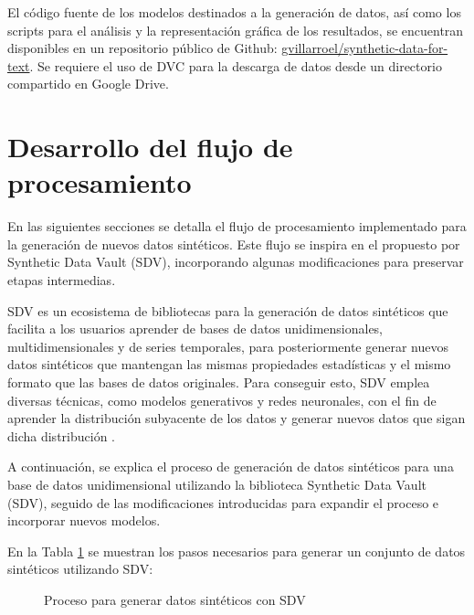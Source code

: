 El código fuente de los modelos destinados a la generación de datos, así como los scripts para el análisis y la representación gráfica de los resultados, se encuentran disponibles en un repositorio público de Github:
\href{https://github.com/gvillarroel/synthetic-data-for-text}{gvillarroel/synthetic-data-for-text}. Se requiere el uso de DVC para la descarga de datos desde un directorio compartido en Google Drive.

\newpage

\section{Desarrollo del flujo de procesamiento}
\label{subsec:procesamiento}
En las siguientes secciones se detalla el flujo de procesamiento implementado para la generación de nuevos datos sintéticos. Este flujo se inspira en el propuesto por Synthetic Data Vault (SDV), incorporando algunas modificaciones para preservar etapas intermedias.

SDV es un ecosistema de bibliotecas para la generación de datos sintéticos que facilita a los usuarios aprender de bases de datos unidimensionales, multidimensionales y de series temporales, para posteriormente generar nuevos datos sintéticos que mantengan las mismas propiedades estadísticas y el mismo formato que las bases de datos originales. Para conseguir esto, SDV emplea diversas técnicas, como modelos generativos y redes neuronales, con el fin de aprender la distribución subyacente de los datos y generar nuevos datos que sigan dicha distribución \cite{kotelnikov_overview_nodate, patki_synthetic_2016}.

A continuación, se explica el proceso de generación de datos sintéticos para una base de datos unidimensional utilizando la biblioteca Synthetic Data Vault (SDV), seguido de las modificaciones introducidas para expandir el proceso e incorporar nuevos modelos.

En la Tabla \ref{process-sdv} se muestran los pasos necesarios para generar un conjunto de datos sintéticos utilizando SDV:

\begin{figure}[H]
	\centering
	
	\caption{Proceso para generar datos sintéticos con SDV}
	\label{process-sdv}
\end{figure}

